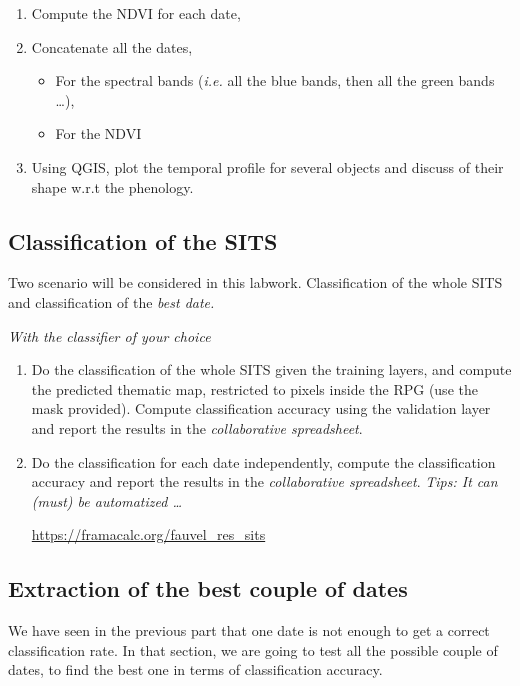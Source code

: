 \documentclass[a4paper,11pt,DIV=18]{scrartcl}
\begin{document}
\begin{work}
\begin{enumerate}
\item Compute the NDVI for each date,
\item Concatenate all the dates,
\begin{itemize}
\item For  the spectral bands  (\emph{i.e.} all the  blue bands, then  all the
green bands \ldots{}),
\item For the NDVI
\end{itemize}
\item Using QGIS,  plot the  temporal  profile for  several objects  and
discuss of their shape w.r.t the phenology.
\end{enumerate}
\end{work}
\subsection{Classification of the SITS}
\label{sec:org60c2d8b}
Two scenario will be considered in this labwork. Classification of the
whole SITS and classification of the \emph{best date.}

\begin{work}
\emph{With the classifier of your choice}
\begin{enumerate}
\item Do the classification of the  whole SITS given the training layers,
and compute the predicted thematic map, restricted to pixels inside
the RPG  (use the  mask provided). Compute  classification accuracy
using  the  validation   layer  and  report  the   results  in  the
\emph{collaborative spreadsheet}.
\item Do the  classification for  each date  independently, compute  the
classification accuracy and report the results in the \emph{collaborative
spreadsheet}. \emph{Tips: It can (must) be automatized \ldots{}}

\url{https://framacalc.org/fauvel\_res\_sits}
\end{enumerate}
\end{work}
\subsection{Extraction of the best couple of dates}
\label{sec:org9ab965f}
We have seen in the previous part that one date is not enough to get a
correct classification rate. In that section, we are going to test all
the  possible couple  of  dates, to  find  the best  one  in terms  of
classification accuracy. 
\end{document}
